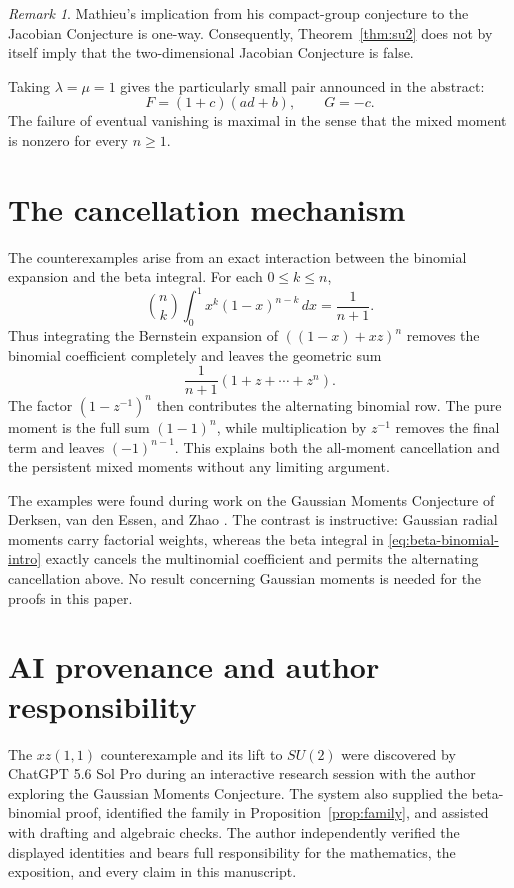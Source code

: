 \documentclass[11pt]{article}
\theoremstyle{remark}
\newtheorem{remark}[theorem]{Remark}
\begin{document}
\begin{remark}\label{rem:one-way-jacobian}
Mathieu's implication from his compact-group conjecture to the Jacobian Conjecture is one-way.  Consequently, Theorem~\ref{thm:su2} does not by itself imply that the two-dimensional Jacobian Conjecture is false.
\end{remark}

Taking $\lambda=\mu=1$ gives the particularly small pair announced in the abstract:
\[
  F=(1+c)(ad+b),
  \qquad
  G=-c.
\]
The failure of eventual vanishing is maximal in the sense that the mixed moment is nonzero for every $n\geq1$.

\section{The cancellation mechanism}

The counterexamples arise from an exact interaction between the binomial expansion and the beta integral.  For each $0\leq k\leq n$,
\[
  \binom nk
  \int_0^1x^k(1-x)^{n-k}\,dx
  =\frac1{n+1}.
\]
Thus integrating the Bernstein expansion of $((1-x)+xz)^n$ removes the binomial coefficient completely and leaves the geometric sum
\[
  \frac1{n+1}(1+z+\cdots+z^n).
\]
The factor $(1-z^{-1})^n$ then contributes the alternating binomial row.  The pure moment is the full sum $(1-1)^n$, while multiplication by $z^{-1}$ removes the final term and leaves $(-1)^{n-1}$.  This explains both the all-moment cancellation and the persistent mixed moments without any limiting argument.

The examples were found during work on the Gaussian Moments Conjecture of Derksen, van den Essen, and Zhao \cite{DVEZ}.  The contrast is instructive: Gaussian radial moments carry factorial weights, whereas the beta integral in \eqref{eq:beta-binomial-intro} exactly cancels the multinomial coefficient and permits the alternating cancellation above.  No result concerning Gaussian moments is needed for the proofs in this paper.

\section*{AI provenance and author responsibility}

The $xz(1,1)$ counterexample and its lift to $SU(2)$ were discovered by ChatGPT 5.6 Sol Pro during an interactive research session with the author exploring the Gaussian Moments Conjecture.  The system also supplied the beta-binomial proof, identified the family in Proposition~\ref{prop:family}, and assisted with drafting and algebraic checks.  The author independently verified the displayed identities and bears full responsibility for the mathematics, the exposition, and every claim in this manuscript.
\end{document}
